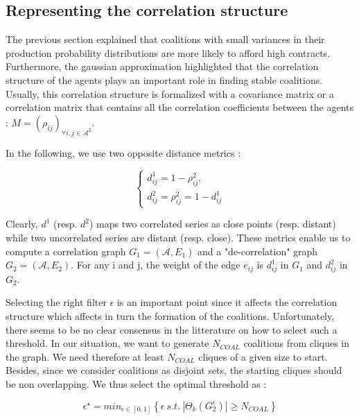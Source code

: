 \documentclass[conference]{IEEEtran}
\begin{document}
\subsection{Representing the correlation structure}

The previous section explained that coalitions with small variances in their production probability distributions are more likely to afford high contracts. Furthermore, the gaussian approximation highlighted that the correlation structure of the agents plays an important role in finding stable coalitions. Usually, this correlation structure is formalized with a covariance matrix or a correlation matrix that contains all the correlation coefficients between the agents : $ M = (\rho_{ij})_{\forall i,j \in \mathcal{A}^{2}}$.

In the following, we use two opposite distance metrics : 

\begin{equation}
\left\{ \begin{array}{lll}
			d_{ij}^{1} = 1 - \rho_{ij}^{2}, \\
			d_{ij}^{2} = \rho_{ij}^{2} = 1 - d_{ij}^{1}
\end{array} \right.
\end{equation}

Clearly, $ d^{1} $ (resp. $ d^{2} $) maps two correlated series as close points (resp. distant) while two uncorrelated series are distant (resp. close). These metrics enable us to compute a correlation graph $ G_{1} = (\mathcal{A}, E_{1}) $ and a "de-correlation" graph $ G_{2} = (\mathcal{A}, E_{2} ) $. For any i and j, the weight of the edge $ e_{ij} $ is $ d_{ij}^{1} $ in $ G_{1} $ and $ d_{ij}^{2} $ in $ G_{2} $.

Selecting the right filter $ \epsilon $ is an important point since it affects the correlation structure which affects in turn the formation of the coalitions. Unfortunately, there seems to be no clear consensus in the litterature on how to select such a threshold. In our situation, we want to generate $ N_{COAL} $ coalitions from cliques in the graph. We need therefore at least $ N_{COAL} $ cliques of a given size to start. Besides, since we consider coalitions as disjoint sets, the starting cliques should be non overlapping. We thus select the optimal threshold as :

\begin{equation}
\label{epsilon_star}
\epsilon^{\star} = min_{ \epsilon \in [0,1]} \left\{ \epsilon\ s.t.\ |\Theta_{k}(G_{2}^{\epsilon})| \geq N_{COAL} \right\}
\end{equation} 
\end{document}
